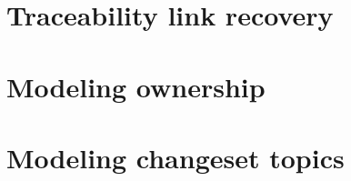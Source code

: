 \section{Traceability link recovery}\label{traceability-link-recovery}

\section{Modeling ownership}\label{modeling-ownership}

\section{Modeling changeset topics}\label{modeling-changeset-topics}
